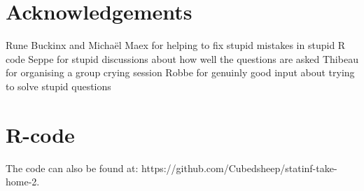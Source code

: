 \documentclass[a4paper]{article}
\begin{document}
\section*{Acknowledgements}
Rune Buckinx and Michaël Maex for helping to fix stupid mistakes in stupid R code
Seppe for stupid discussions about how well the questions are asked
Thibeau for organising a group crying session
Robbe for genuinly good input about trying to solve stupid questions

\printbibliography

\newpage
\section*{R-code}
The code can also be found at: https://github.com/Cubedsheep/statinf-take-home-2.







\end{document}

